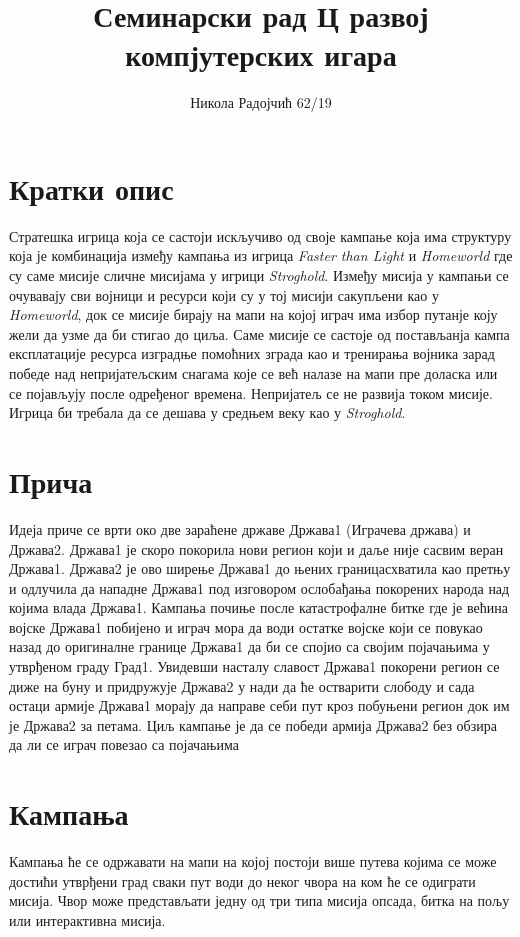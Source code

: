 \documentclass[11pt,a4paper]{article}
\title{Семинарски рад Ц развој компјутерских игара}
\author{Никола Радојчић 62/19}
\begin{document}
\maketitle
\newpage

\tableofcontents
\newpage

\section{Кратки опис}
Стратешка игрица која се састоји искључиво од своје кампање која има структуру која је комбинација између кампања из игрица \emph{Faster than Light} и \emph{Homeworld} где су саме мисије сличне мисијама у игрици \emph{Stroghold}. Између мисија у кампањи се очувавају сви војници и ресурси који су у тој мисији сакупљени као у \emph{Homeworld}, док се мисије бирају на мапи на којој играч има избор путанје коју жели да узме да би стигао до циља. Саме мисије се састоје од постављанја кампа експлатације ресурса изградње помоћних зграда као и тренирања војника зарад победе над непријатељским снагама које се већ налазе на мапи пре доласка или се појављују после одређеног времена. Непријатељ се не развија током мисије. Игрица би требала да се дешава у средњем веку као у \emph{Stroghold}.

\section{Прича}
Идеја приче се врти око две зараћене државе Држава1 (Играчева држава) и Држава2. Држава1 је скоро покорила нови регион који и даље није сасвим веран Држава1. Држава2 је ово ширење Држава1 до њених границасхватила као претњу и одлучила да нападне Држава1 под изговором ослобађања покорених народа над којима влада Држава1. Кампања почиње после катастрофалне битке где је већина војске Држава1 побијено и играч мора да води остатке војске који се повукао назад до оригиналне границе Држава1 да би се спојио са својим појачањима у утврђеном граду Град1. Увидевши насталу славост Држава1 покорени регион се диже на буну и придружује Држава2 у нади да ће остварити слободу и сада остаци армије Држава1 морају да направе себи пут кроз побуњени регион док им је Држава2 за петама. Циљ кампање је да се победи армија Држава2 без обзира да ли се играч повезао са појачањима

\section{Кампања}
Кампања ће се одржавати на мапи на којој постоји више путева којима се може достићи утврђени град сваки пут води до неког чвора на ком ће се одиграти мисија. Чвор може представљати једну од три типа мисија опсада, битка на пољу или интерактивна мисија.
\end{document}
